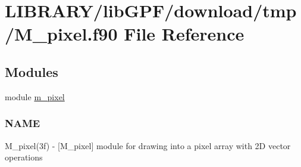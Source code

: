 \hypertarget{M__pixel_8f90}{}\section{L\+I\+B\+R\+A\+R\+Y/lib\+G\+P\+F/download/tmp/\+M\+\_\+pixel.f90 File Reference}
\label{M__pixel_8f90}
\subsection*{Modules}
\begin{DoxyCompactItemize}
\item 
module \hyperlink{namespacem__pixel}{m\+\_\+pixel}
\begin{DoxyCompactList}\small\item\em \subsubsection*{N\+A\+ME}

M\+\_\+pixel(3f) -\/ \mbox{[}M\+\_\+pixel\mbox{]} module for drawing into a pixel array with 2D vector operations \end{DoxyCompactList}\end{DoxyCompactItemize}
